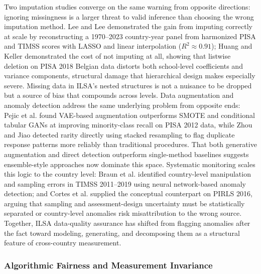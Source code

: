 \documentclass{ieeeaccess}
\begin{document}
Two imputation studies converge on the same warning from opposite directions: ignoring missingness is a larger threat to valid inference than choosing the wrong imputation method. Lee and Lee \cite{lee-lee-ExtendedDataset2025} demonstrated the gain from imputing correctly at scale by reconstructing a 1970--2023 country-year panel from harmonized PISA and TIMSS scores with LASSO and linear interpolation ($R^{2} \approx 0.91$); Huang and Keller \cite{huang-keller2025} demonstrated the cost of not imputing at all, showing that listwise deletion on PISA 2018 Belgian data distorts both school-level coefficients and variance components, structural damage that hierarchical design makes especially severe. Missing data in ILSA's nested structures is not a nuisance to be dropped but a source of bias that compounds across levels. Data augmentation and anomaly detection address the same underlying problem from opposite ends: Pejic et al. \cite{pejic-etal2022} found VAE-based augmentation outperforms SMOTE and conditional tabular GANs at improving minority-class recall on PISA 2012 data, while Zhou and Jiao \cite{zhou-jiao2023} detected rarity directly using stacked resampling to flag duplicate response patterns more reliably than traditional procedures. That both generative augmentation and direct detection outperform single-method baselines suggests ensemble-style approaches now dominate this space. Systematic monitoring scales this logic to the country level: Braun et al. \cite{braun-etal2025} identified country-level manipulation and sampling errors in TIMSS 2011--2019 using neural network-based anomaly detection; and Cortes et al. \cite{cortes-etal2025} supplied the conceptual counterpart on PIRLS 2016, arguing that sampling and assessment-design uncertainty must be statistically separated or country-level anomalies risk misattribution to the wrong source. Together, ILSA data-quality assurance has shifted from flagging anomalies after the fact toward modeling, generating, and decomposing them as a structural feature of cross-country measurement.

\subsubsection{Algorithmic Fairness and Measurement Invariance}\label{subsubsec4.5.2}
\end{document}
